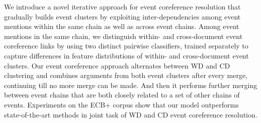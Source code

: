 We introduce a novel iterative approach for event coreference resolution that gradually builds event clusters by exploiting inter-dependencies among event mentions within the same chain as well as across event chains. Among event mentions in the same chain, we distinguish within- and cross-document event coreference links by using two distinct pairwise classifiers, trained separately to capture differences in feature distributions of within- and cross-document event clusters. Our event coreference approach alternates between WD and CD clustering and combines arguments from both event clusters after every merge, continuing till no more merge can be made. And then it performs further merging between event chains that are both closely related to a set of other chains of events. Experiments on the ECB+ corpus show that our model outperforms state-of-the-art methods in joint task of WD and CD event coreference resolution.
